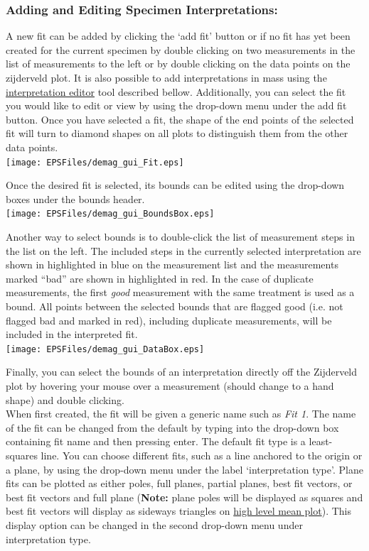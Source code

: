 \documentclass[11pt]{book}
\begin{document}
{\subsubsection{Adding and Editing Specimen Interpretations:}\label{adding-interpretations}

A new fit can be added by clicking the `add fit' button or if no fit has yet been created for the current specimen by double clicking on two measurements in the list of measurements to the left or by double clicking on the data points on the zijderveld plot. It is also possible to add interpretations in mass using the \hyperref[interpretation-editor]{interpretation editor} tool described bellow. Additionally, you can select the fit you would like to edit or view by using the drop-down menu under the add fit button. Once you have selected a fit, the shape of the end points of the selected fit will turn to diamond shapes on all plots to distinguish them from the other data points.\\

\texttt{[image: EPSFiles/demag\_gui\_Fit.eps]}

\noindent Once the desired fit is selected, its bounds can be edited using the drop-down boxes under the bounds header.\\

\texttt{[image: EPSFiles/demag\_gui\_BoundsBox.eps]}

\noindent Another way to select bounds is to double-click the list of measurement steps in the list on the left. The included steps in the currently selected interpretation are shown in highlighted in blue on the measurement list and the measurements marked ``bad'' are shown in highlighted in red. In the case of duplicate measurements, the first \emph{good} measurement with the same treatment is used as a bound. All points between the selected bounds that are flagged good (i.e. not flagged bad and marked in red), including duplicate measurements, will be included in the interpreted fit.\\

\texttt{[image: EPSFiles/demag\_gui\_DataBox.eps]}

\noindent Finally, you can select the bounds of an interpretation directly off the Zijderveld plot by hovering your mouse over a measurement (should change to a hand shape) and double clicking.\\

\noindent When first created, the fit will be given a generic name such as
\emph{Fit 1}. The name of the fit can be changed from the default by typing into the drop-down box containing fit name and then pressing enter. The default fit type is a least-squares line. You can choose different fits, such as a line anchored to the origin or a plane, by using the drop-down menu under the label `interpretation type'. Plane fits can be plotted as either poles, full planes, partial planes, best fit vectors, or best fit vectors and full plane ({\bf Note:} plane poles will be displayed as squares and best fit vectors will display as sideways triangles on \hyperref[higher-level-plots-and-interpretation]{high level mean plot}). This display option can be changed in the second drop-down menu under interpretation type.\\

}
\end{document}
